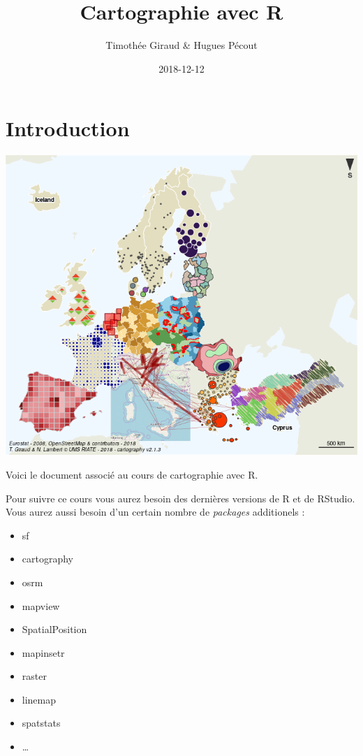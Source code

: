 \documentclass[]{book}
\title{Cartographie avec R}
\author{Timothée Giraud \& Hugues Pécout}
\date{2018-12-12}
\providecommand{\tightlist}{%
  \setlength{\itemsep}{0pt}\setlength{\parskip}{0pt}}
\begin{document}
\maketitle

{
\setcounter{tocdepth}{1}
\tableofcontents
}
\hypertarget{introduction}{%
\chapter*{Introduction}\label{introduction}}

\includegraphics{img/cartomix.png}

Voici le document associé au cours de cartographie avec R.

Pour suivre ce cours vous aurez besoin des dernières versions de R et de RStudio.\\
Vous aurez aussi besoin d'un certain nombre de \emph{packages} additionels :

\begin{itemize}
\tightlist
\item
  sf
\item
  cartography
\item
  osrm
\item
  mapview
\item
  SpatialPosition
\item
  mapinsetr
\item
  raster
\item
  linemap
\item
  spatstats
\item
  \ldots{}
\end{itemize}
\end{document}
